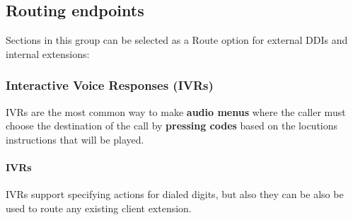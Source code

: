 \documentclass[letterpaper,10pt,spanish]{sphinxmanual}
\begin{document}
\subsection{Routing endpoints}
\label{administration_portal/client/vpbx/routing_endpoints/index:routing-endpoints}\label{administration_portal/client/vpbx/routing_endpoints/index::doc}
Sections in this group can be selected as a Route option for external DDIs and internal extensions:


\subsubsection{Interactive Voice Responses (IVRs)}
\label{administration_portal/client/vpbx/routing_endpoints/ivrs:interactive-voice-responses-ivrs}\label{administration_portal/client/vpbx/routing_endpoints/ivrs::doc}
IVRs are the most common way to make \textbf{audio menus} where the caller must
choose the destination of the call by \textbf{pressing codes} based on the locutions
instructions that will be played.


\paragraph{IVRs}
\label{administration_portal/client/vpbx/routing_endpoints/ivrs:ivrs}
IVRs support specifying actions for dialed digits, but also they can be also be used
to route any existing client extension.
\end{document}
